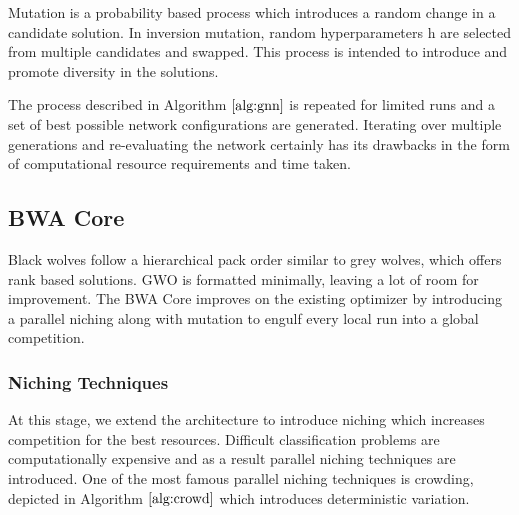 \documentclass[conference]{IEEEtran}
\begin{document}
\begin{itemize}
Mutation is a probability based process which introduces a random change in a candidate solution. In inversion mutation, random hyperparameters $\textit{h}$ are selected from multiple candidates and swapped. This process is intended to introduce and promote diversity in the solutions. 

\end{itemize}
The process described in Algorithm $\ref{alg:gnn}$ is repeated for limited runs and a set of best possible network configurations are generated. Iterating over multiple generations and re-evaluating the network certainly has its drawbacks in the form of computational resource requirements and time taken. 

\subsection{BWA Core}
Black wolves follow a hierarchical pack order similar to grey wolves, which offers rank based solutions. GWO is formatted minimally, leaving a lot of room for improvement. The BWA Core improves on the existing optimizer by introducing a parallel niching along with mutation to engulf every local run into a global competition. 
\subsubsection{Niching Techniques}
At this stage, we extend the architecture to introduce niching which increases competition for the best resources. Difficult classification problems are computationally expensive and as a result parallel niching techniques are introduced. One of the most famous parallel niching techniques is crowding, depicted in Algorithm $\ref{alg:crowd}$ which introduces deterministic variation. 
\end{document}
